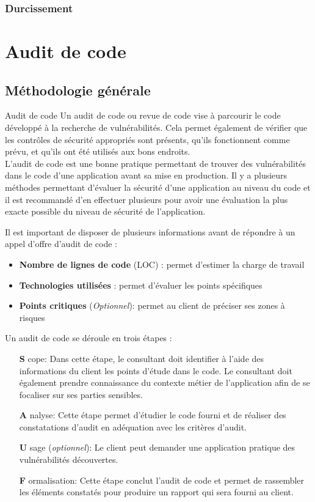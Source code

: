 \documentclass[twoside,a4paper,12pt,titlepage]{book}
\begin{document}
\subsection{Durcissement}

\chapter{Audit de code}
\section{Méthodologie générale}

\begin{Define}{Audit de code}
Un audit de code ou revue de code vise à parcourir le code développé à la recherche de vulnérabilités. Cela permet également de vérifier que les contrôles de sécurité appropriés sont présents, qu'ils fonctionnent comme prévu, et qu'ils ont été utilisés aux bons endroits.\\
L’audit de code est une bonne pratique permettant de trouver des vulnérabilités dans le code d’une application avant sa mise en production. Il y a plusieurs méthodes permettant d’évaluer la sécurité d’une application au niveau du code et il est recommandé d’en effectuer plusieurs pour avoir une évaluation la plus exacte possible du niveau de sécurité de l’application.
\end{Define}
\begin{Pre}
Il est important de disposer de plusieurs informations avant de répondre à un appel d'offre d'audit de code :\begin{itemize}
\item \textbf{Nombre de lignes de code} (LOC) : permet d’estimer la charge de travail
\item \textbf{Technologies utilisées} : permet d'évaluer les points spécifiques
\item \textbf{Points critiques} (\textit{Optionnel}): permet au client de préciser ses zones à risques
\end{itemize}
\end{Pre}
Un audit de code se déroule en trois étapes :\begin{itemize}
\item[\textbf{S}]cope: 
Dans cette étape, le consultant doit identifier à l’aide des informations du client les points d'étude dans le code. Le consultant doit également prendre connaissance du contexte métier de l’application afin de se focaliser sur ses parties sensibles.
\item[\textbf{A}]nalyse: 
Cette étape permet d'étudier le code fourni et de réaliser des constatations d'audit en adéquation avec les critères d'audit.
\item[\textbf{U}]sage (\textit{optionnel}): Le client peut demander une application pratique des vulnérabilités découvertes.
\item[\textbf{F}]ormalisation: Cette étape conclut l’audit de code et permet de rassembler les éléments constatés pour produire un rapport qui sera fourni au client.
\end{itemize}
\end{document}
